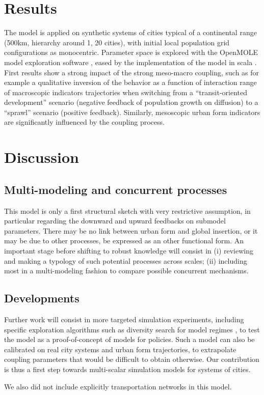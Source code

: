 \documentclass[11pt]{article}
\begin{document}
\section{Results}

The model is applied on synthetic systems of cities typical of a continental range (500km, hierarchy around 1, 20 cities), with initial local population grid configurations as monocentric. Parameter space is explored with the OpenMOLE model exploration software \cite{reuillon2013openmole}, eased by the implementation of the model in scala \cite{model}. First results show a strong impact of the strong meso-macro coupling, such as for example a qualitative inversion of the behavior as a function of interaction range of macroscopic indicators trajectories when switching from a ``transit-oriented development'' scenario (negative feedback of population growth on diffusion) to a ``sprawl'' scenario (positive feedback). Similarly, mesoscopic urban form indicators are significantly influenced by the coupling process.


\section{Discussion}


\subsection{Multi-modeling and concurrent processes}

This model is only a first structural sketch with very restrictive assumption, in particular regarding the downward and upward feedbacks on submodel parameters. There may be no link between urban form and global insertion, or it may be due to other processes, be expressed as an other functional form. An important stage before shifting to robust knowledge will consist in (i) reviewing and making a typology of such potential processes across scales; (ii) including most in a multi-modeling fashion to compare possible concurrent mechanisms.


\subsection{Developments}

Further work will consist in more targeted simulation experiments, including specific exploration algorithms such as diversity search for model regimes \cite{reuillon2013openmole}, to test the model as a proof-of-concept of models for policies. Such a model can also be calibrated on real city systems and urban form trajectories, to extrapolate coupling parameters that would be difficult to obtain otherwise. Our contribution is thus a first step towards multi-scalar simulation models for systems of cities.

We also did not include explicitly transportation networks in this model.






\end{document}
